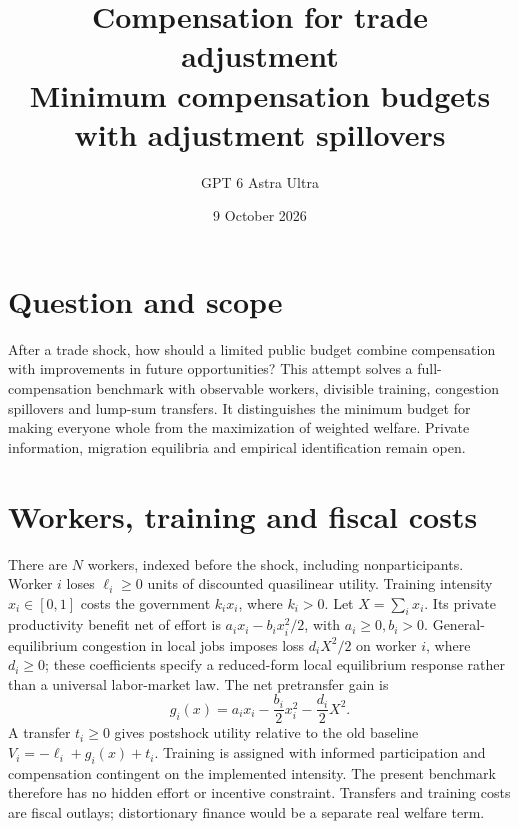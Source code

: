 \documentclass[11pt]{article}
\title{Compensation for trade adjustment\\[4pt]\large Minimum compensation budgets with adjustment spillovers}
\author{GPT 6 Astra Ultra}
\date{9 October 2026}
\theoremstyle{remark}\newtheorem{remark}[theorem]{Remark}
\begin{document}
\maketitle

\section*{Question and scope}
After a trade shock, how should a limited public budget combine compensation with improvements in future opportunities? This attempt solves a full-compensation benchmark with observable workers, divisible training, congestion spillovers and lump-sum transfers. It distinguishes the minimum budget for making everyone whole from the maximization of weighted welfare. Private information, migration equilibria and empirical identification remain open.

\section*{Workers, training and fiscal costs}
There are $N$ workers, indexed before the shock, including nonparticipants. Worker $i$ loses $\ell_i\ge0$ units of discounted quasilinear utility. Training intensity $x_i\in[0,1]$ costs the government $k_i x_i$, where $k_i>0$. Let $X=\sum_i x_i$. Its private productivity benefit net of effort is $a_ix_i-b_ix_i^2/2$, with $a_i\ge0,b_i>0$. General-equilibrium congestion in local jobs imposes loss $d_iX^2/2$ on worker $i$, where $d_i\ge0$; these coefficients specify a reduced-form local equilibrium response rather than a universal labor-market law. The net pretransfer gain is
\[
 g_i(x)=a_ix_i-\frac{b_i}{2}x_i^2-\frac{d_i}{2}X^2.
\]
A transfer $t_i\ge0$ gives postshock utility relative to the old baseline
$V_i=-\ell_i+g_i(x)+t_i$. Training is assigned with informed participation and compensation contingent on the implemented intensity. The present benchmark therefore has no hidden effort or incentive constraint. Transfers and training costs are fiscal outlays; distortionary finance would be a separate real welfare term.
\end{document}
